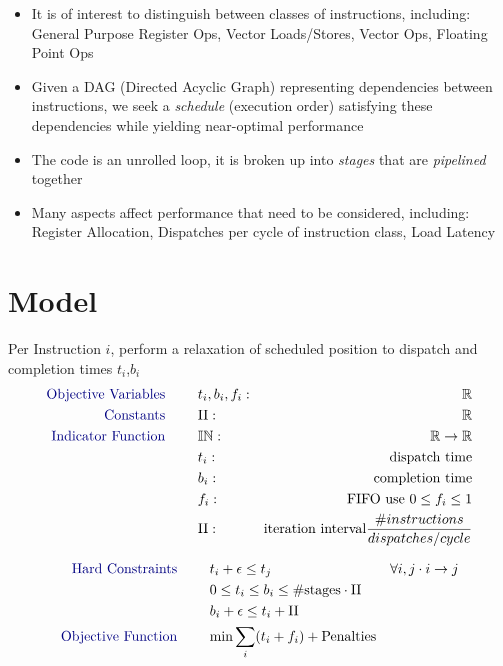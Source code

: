 \documentclass[a0,landscape,24pt]{a0poster}
\begin{document}
\begin{multicols}{3}
\begin{itemize}
	\item It is of interest to distinguish between classes of instructions, including: {\color{red} General Purpose Register Ops}, {\color{Green} Vector Loads/Stores}, {\color{orange} Vector Ops}, {\color{blue} Floating Point Ops}
	\item Given a DAG (Directed Acyclic Graph) representing dependencies between instructions, we seek a {\it schedule} (execution order) satisfying these dependencies while yielding near-optimal performance
	\item The code is an unrolled loop, it is broken up into {\it stages} that are {\it pipelined} together
	\item Many aspects affect performance that need to be considered, including: Register Allocation, Dispatches per cycle of instruction class, Load Latency 
\end{itemize}

\color{DarkSlateGray} %

\section*{Model}

    Per Instruction $i$, perform a relaxation of scheduled position to dispatch and completion times $t_i$,$b_i$
    \begin{align*}
    \text{\color{Navy} Objective Variables \qquad} & t_i, b_i, f_i:& \mathbb{R} \\
    \text{\color{Navy} Constants \qquad} & \textrm{II} :& \mathbb{R} \\
    \text{\color{Navy} Indicator Function \qquad} & \mathbb{IN} :& \mathbb{R} \rightarrow \mathbb{R} \\
    & t_i :& \text{dispatch time} \\
    & b_i :& \text{completion time} \\
    & f_i :& \text{FIFO use } 0 \leq f_i \leq 1 \\
    & \textrm{II} :& \text{iteration interval} \frac{\# instructions}{dispatches/cycle} \\
    \end{align*}
    
    \begin{align}
    \text{\color{Navy} Hard Constraints \qquad}  & t_i + \epsilon \leq t_j \qquad & \forall i,j \cdot i \rightarrow j \\
								 & 0 \leq t_i \leq b_i \leq \#\text{stages} \cdot \textrm{II}  & \\
								 & b_i + \epsilon \leq t_i + \textrm{II} \\
    \text{\color{Navy} Objective Function \qquad}   & \text{min} \sum_{i} (t_i + f_i) + \text{Penalties}
    \end{align}





\end{multicols}
\end{document}

